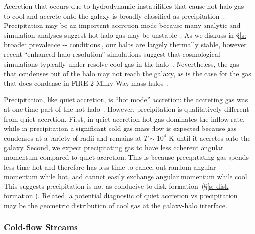 \documentclass[fleqn,usenatbib]{mnras}
\begin{document}
Accretion that occurs due to hydrodynamic instabilities that cause hot halo gas to cool and accrete onto the galaxy is broadly classified as precipitation~\citep[e.g.][]{Sharma2012, Voit2015a, Voit2018, Voit2021}.
Precipitation may be an important accretion mode because many analytic and simulation analyses suggest hot halo gas may be unstable~\citep[e.g.][]{Balbus1989, Maller2004, McCourt2012, McCourt2016, Joung2012a, Li2014, Armillotta2016, McNamara2016, Schneider2018, Liang2018a, Gronke2019, Gronke2019a, Li2019, Fielding2020}.
As we diskuss in \S\ref{s: broader prevalence -- conditions}, our halos are largely thermally stable, however recent ``enhanced halo resolution'' simulations suggest that cosmological simulations typically under-resolve cool gas in the halo~\citep{VandeVoort2018, Peeples2019a, Hummels2019, Suresh2019}.
Nevertheless, the gas that condenses out of the halo may not reach the galaxy, as is the case for the gas that does condense in FIRE-2 Milky-Way mass halos~\citep{Esmerian2020}.

Precipitation, like quiet accretion, is ``hot mode'' accretion: the accreting gas was at one time part of the hot halo~\citep[e.g.][]{Nelson2013}.
However, precipitation is qualitatively different from quiet accretion.
First, in quiet accretion hot gas dominates the inflow rate, while in precipitation a significant cold gas mass flow is expected because gas condenses at a variety of radii and remains at $T\sim 10^4$ K until it accretes onto the galaxy.
Second, we expect precipitating gas to have less coherent angular momentum compared to quiet accretion.
This is because precipitating gas spends less time hot and therefore has less time to cancel out random angular momentum while hot, and cannot easily exchange angular momentum while cool.
This suggests precipitation is not as conducive to disk formation~(\S\ref{s: disk formation}).
Related, a potential diagnostic of quiet accretion vs precipitation may be the geometric distribution of cool gas at the galaxy-halo interface.

\subsubsection{Cold-flow Streams}
\label{s: modes -- cold}
\end{document}
